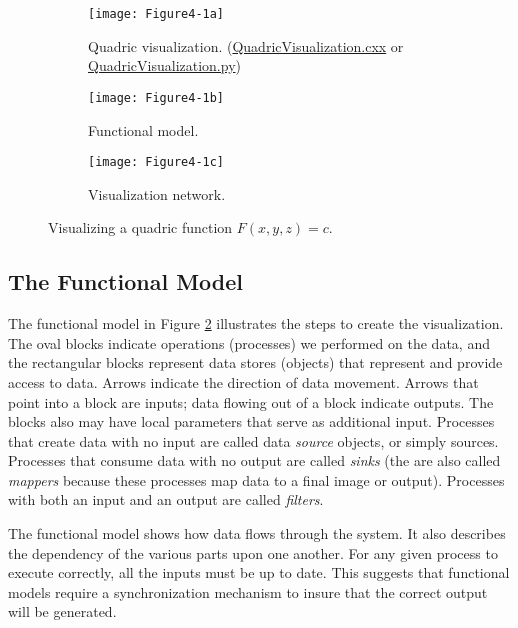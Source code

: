 \begin{figure}[htb]
  \begin{subfigure}[h]{0.68\linewidth}
    \texttt{[image: Figure4-1a]}
    \caption{Quadric visualization. (\href{https://lorensen.github.io/VTKExamples/site/Cxx/Visualization/QuadricVisualization/}{QuadricVisualization.cxx} or \href{https://lorensen.github.io/VTKExamples/site/Python/Visualization/QuadricVisualization/}{QuadricVisualization.py})}
    \label{fig:Figure4-1a}
  \end{subfigure}
  \hfill
  \begin{subfigure}[h]{0.68\linewidth}
    \texttt{[image: Figure4-1b]}
    \caption{Functional model.}\label{fig:Figure4-1b}
  \end{subfigure}%
  \hfill
  \begin{subfigure}[h]{0.68\linewidth}
    \texttt{[image: Figure4-1c]}
    \caption{Visualization network.}\label{fig:Figure4-1c}
  \end{subfigure}
  \caption{Visualizing a quadric function $F(x,y,z) = c$.}\label{fig:Figure4-1}
\end{figure}

\subsection{The Functional Model}
\label{subsec:the_functional_model}

The functional model in Figure \ref{fig:Figure4-1b} illustrates the steps to create the visualization. The oval blocks indicate operations (processes) we performed on the data, and the rectangular blocks represent data stores (objects) that represent and provide access to data. Arrows indicate the direction of data movement. Arrows that point into a block are inputs; data flowing out of a block indicate outputs. The blocks also may have local parameters that serve as additional input. Processes that create data with no input are called data \emph{source} objects, or simply sources. Processes that consume data with no output are called \emph{sinks} (the are also called \emph{mappers} because these processes map data to a final image or output). Processes with both an input and an output are called \emph{filters}.

The functional model shows how data flows through the system. It also describes the dependency of the various parts upon one another. For any given process to execute correctly, all the inputs must be up to date. This suggests that functional models require a synchronization mechanism to insure that the correct output will be generated.

